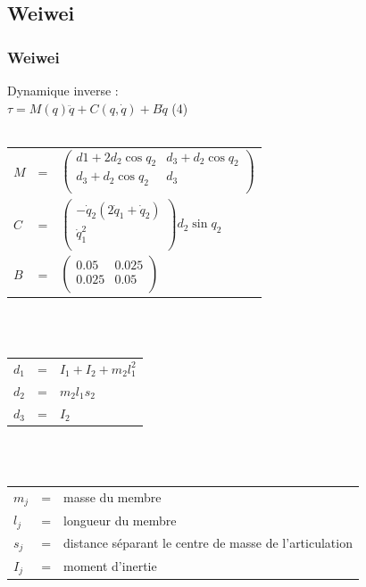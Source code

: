\documentclass{beamer}
\begin{document}

\subsection{Weiwei}

\begin{frame}
\frametitle{Weiwei}
Dynamique inverse :\\
$\tau = M(q)\ddot{q} + C(q, \dot{q}) + B\dot{q} $ (4)\\
~\\
\begin{tabular}{lcl}
    $M$ & = &
    $
    \begin{pmatrix}
        d1 + 2 d_2 \cos q_2  & d_3 + d_2 \cos q_2 \\
        d_3 + d_2 \cos q_2 & d_3 \\
    \end{pmatrix}
    $ \\

    $C$ & = &
    $
    \begin{pmatrix}
        -\dot{q}_2 (2 \dot{q}_1 + \dot{q}_2) \\
        \dot{q}_1^2 \\
    \end{pmatrix}
    d_2 \sin q_2
    $\\

    $B$ & = &
    $
    \begin{pmatrix}
        0.05  & 0.025 \\
        0.025 & 0.05 \\
    \end{pmatrix}
    $
\end{tabular}\\
~\\
\begin{tabular}{lcl}
    $d_1$ & = & $I_1 + I_2 + m_2 l_1^2$ \\
    $d_2$ & = & $m_2 l_1 s_2$ \\
    $d_3$ & = & $I_2$ \\
\end{tabular}\\
~\\
\begin{tabular}{lcl}
    $m_j$ & = & masse du membre \\
    $l_j$ & = & longueur du membre \\
    $s_{j}$ & = & distance séparant le centre de masse de l'articulation \\
    $I_{j}$ & = & moment d'inertie \\
\end{tabular}\\
\end{frame}
\end{document}

